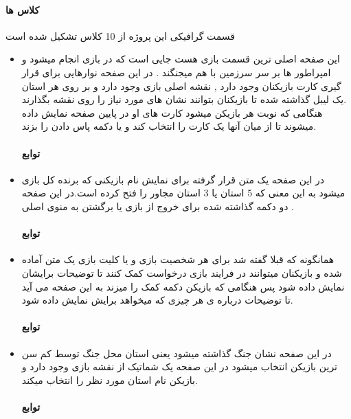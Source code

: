 \documentclass[pdf,titlepage,a4paper]{report}
\begin{document}
	\paragraph{کلاس ها}
	قسمت گرافیکی این پروژه از 10 کلاس تشکیل شده است \\
	\begin{itemize}
		\item {}  این صفحه اصلی ترین قسمت بازی هست جایی است که در بازی انجام میشود و امپراطور ها بر سر سرزمین با هم میجنگند . در این صفحه نوارهایی برای قرار گیری کارت بازیکنان وجود دارد , نقشه اصلی بازی وجود دارد و بر روی هر استان یک لیبل گذاشته شده تا بازیکنان بتوانند نشان های مورد نیاز را روی نقشه بگذارند.\\ هنگامی که نوبت هر بازیکن میشود کارت های او در پایین صفحه نمایش داده میشوند تا از میان آنها یک کارت را انتخاب کند و یا دکمه پاس دادن را بزند.\\
		\paragraph{توابع} 
		
		\item {}  در این صفحه یک متن قرار گرفته برای نمایش نام بازیکنی که برنده کل بازی میشود به این معنی که 5 استان یا 3 استان مجاور را فتح کرده است.در این صفحه دو دکمه گذاشته شده برای خروج از بازی یا برگشتن به منوی اصلی .\\
		\paragraph{توابع} 

		\item {}  همانگونه که قبلا گفته شد برای هر شخصیت بازی و یا کلیت بازی یک متن آماده شده و بازیکنان میتوانند در فرایند بازی درخواست کمک کنند تا توضیحات برایشان نمایش داده شود پس هنگامی که بازیکن دکمه کمک را میزند به این صفحه می آید تا توضیحات درباره ی هر چیزی که میخواهد برایش نمایش داده شود.\\
		\paragraph{توابع} 

		\item {}  در این صفحه نشان جنگ گذاشته میشود یعنی استان محل جنگ توسط کم سن ترین بازیکن انتخاب میشود در این صفحه یک شماتیک از نقشه بازی وجود دارد و بازیکن نام استان مورد نظر را انتخاب میکند.\\
		\paragraph{توابع} 


\end{itemize}
\end{document}
